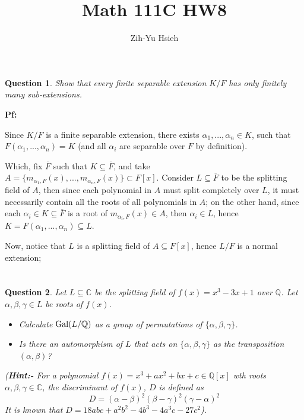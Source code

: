 \documentclass{article}
\title{Math 111C HW8}
\author{Zih-Yu Hsieh}
\newtheorem{question}{Question}
\newcommand{\QQ}{\mathbb{Q}}
\newcommand{\CC}{\mathbb{C}}
\newcommand{\Gal}{\textmd{Gal}}
\begin{document}
\maketitle

\section{}%
\begin{question}\label{q1}
    Show that every finite separable extension $K/F$ has only finitely many sub-extensions.
\end{question}

\textbf{Pf:}

Since $K/F$ is a finite separable extension, there exists $\alpha_1,...,\alpha_n\in K$, such that $F(\alpha_1,...,\alpha_n)=K$ (and all $\alpha_i$ are separable over $F$ by definition).

Which, fix $\overline{F}$ such that $K\subseteq\overline{F}$, and take $A=\{m_{\alpha_1,F}(x),...,m_{\alpha_n,F}(x)\}\subset F[x]$. Consider $L\subseteq\overline{F}$ to be the splitting field of $A$, then since each polynomial in $A$ must split completely over $L$, it must necessarily contain all the roots of all polynomials in $A$; on the other hand, since each $\alpha_i\in K\subseteq \overline{F}$ is a root of $m_{\alpha_i,F}(x)\in A$, then $\alpha_i\in L$, hence $K=F(\alpha_1,...,\alpha_n)\subseteq L$.

Now, notice that $L$ is a splitting field of $A\subseteq F[x]$, hence $L/F$ is a normal extension; 

\break

\section{}
\begin{question}\label{q2}
    Let $L\subseteq\mathbb{C}$ be the splitting field of $f(x)=x^3-3x+1$ over $\mathbb{Q}$. Let $\alpha,\beta,\gamma\in L$ be roots of $f(x)$.
    \begin{itemize}
        \item[(a)] Calculate $\Gal(L/\QQ)$ as a group of permutations of $\{\alpha,\beta,\gamma\}$.
        \item[(b)] Is there an automorphism of $L$ that acts on $\{\alpha,\beta,\gamma\}$ as the transposition $(\alpha,\beta)$?
    \end{itemize}
    (\textbf{Hint:-} For a polynomial $f(x)=x^3+ax^2+bx+c\in\QQ[x]$ wth roots $\alpha,\beta,\gamma\in \CC$, the discriminant of $f(x)$, $D$ is defined as 
    $$D=(\alpha-\beta)^2(\beta-\gamma)^2(\gamma-\alpha)^2$$
    It is known that $D=18abc+a^2b^2-4b^3-4a^3c-27c^2$).
\end{question}
\end{document}
